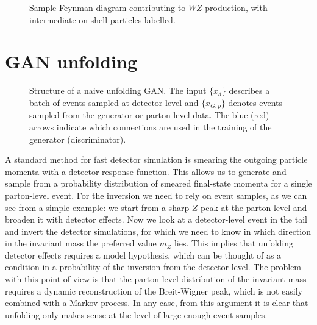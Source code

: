 \begin{figure}[b!]
\begin{center}

\end{center}
\caption{Sample Feynman diagram contributing to $WZ$ production, with
  intermediate on-shell particles labelled.}
\label{fig:feyn_intro}
\end{figure}

\section{GAN unfolding}
\label{sec:gan}

\begin{figure}[t]
\centering

\caption{Structure of a naive unfolding GAN. The input $\{ x_d \}$
  describes a batch of events sampled at detector level and $\{
  x_{G,p} \}$ denotes events sampled from the generator or
  parton-level data. The blue (red) arrows indicate which
  connections are used in the training of the generator
  (discriminator).}
\label{fig:GANs}
\end{figure}

A standard method for fast detector simulation is
smearing the outgoing particle momenta with a detector response
function. This allows us to generate and sample from a probability
distribution of smeared final-state momenta for a single parton-level
event. For the inversion we need to rely on event samples, as we can
see from a simple example: we start from a sharp $Z$-peak at the
parton level and broaden it with detector effects. Now we look at a
detector-level event in the tail and invert the detector simulations,
for which we need to know in which direction in the invariant mass the
preferred value $m_Z$ lies. This implies that unfolding detector
effects requires a model hypothesis, which can be thought of as a
condition in a probability of the inversion from the detector
level. The problem with this point of view is that the parton-level
distribution of the invariant mass requires a dynamic reconstruction
of the Breit-Wigner peak, which is not easily combined with a Markov
process. In any case, from this argument it is clear that unfolding
only makes sense at the level of large enough event samples.

